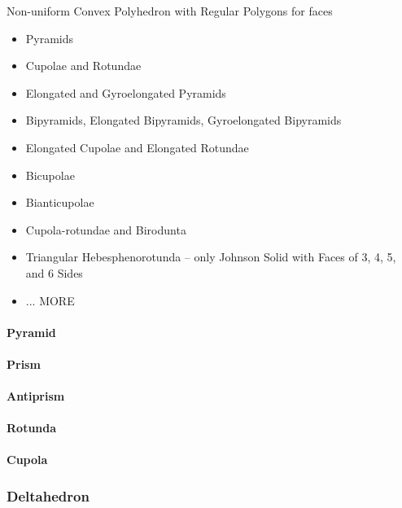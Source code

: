 Non-uniform Convex Polyhedron with Regular Polygons for faces

\begin{itemize}
  \item Pyramids
  \item Cupolae and Rotundae
  \item Elongated and Gyroelongated Pyramids
  \item Bipyramids, Elongated Bipyramids, Gyroelongated Bipyramids
  \item Elongated Cupolae and Elongated Rotundae
  \item Bicupolae
  \item Bianticupolae
  \item Cupola-rotundae and Birodunta
  \item Triangular Hebesphenorotunda -- only Johnson Solid with Faces of 3, 4,
    5, and 6 Sides
  \item ... MORE
\end{itemize}



\paragraph{Pyramid}\label{sec:pyramid}\hfill

\paragraph{Prism}\label{sec:prism}\hfill

\paragraph{Antiprism}\label{sec:antiprism}\hfill

\paragraph{Rotunda}\label{sec:rotunda}\hfill

\paragraph{Cupola}\label{sec:cupola}\hfill



\subsubsection{Deltahedron}\label{sec:deltahedron}

